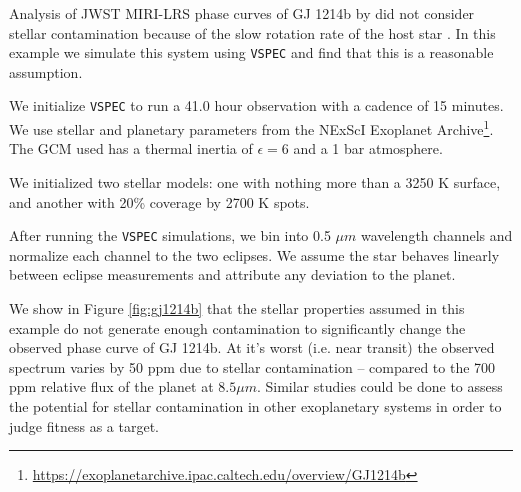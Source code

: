 \documentclass[twocolumn,linenumbers]{aastex631}
\newcommand{\vspec}[1]{\texttt{VSPEC}#1}
\begin{document}
Analysis of JWST MIRI-LRS phase curves of GJ 1214b by \citet{kempton2023} did not consider stellar
contamination because of the slow rotation rate of the host star \citep[approximately 1/80$^{\text{th}}$ the orbital frequency,][]{cloutier2021}.
In this example we simulate this system using \vspec{} and find that this is a reasonable assumption.

We initialize \vspec{} to run a 41.0 hour observation with a cadence of 15 minutes. We use stellar and planetary parameters
from the NExScI Exoplanet Archive\footnote{\url{https://exoplanetarchive.ipac.caltech.edu/overview/GJ1214b}}.
The GCM used has a thermal inertia of $\epsilon = 6$ and a 1 bar  atmosphere.

We initialized two stellar models: one with nothing more than a 3250 K surface, and another with 20\% coverage by 2700 K spots.

After running the \vspec{} simulations, we bin into 0.5 $\mu m$ wavelength channels and normalize each channel to the two eclipses.
We assume the star behaves linearly between eclipse measurements and attribute any deviation to the planet.

We show in Figure \ref{fig:gj1214b} that the stellar properties assumed in this example do not generate enough contamination to
significantly change the observed phase curve of GJ 1214b. At it's worst (i.e. near transit) the observed spectrum varies by 50 ppm due to stellar
contamination -- compared to the 700 ppm relative flux of the planet at $8.5 {\mu m}$. Similar studies could be done to assess the potential for
stellar contamination in other exoplanetary systems in order to judge fitness as a target.


\end{document}
